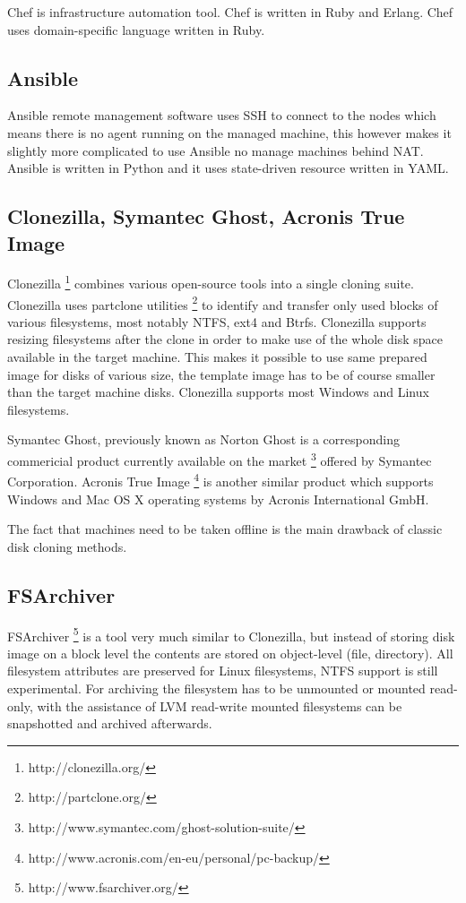 \documentclass{article}
\begin{document}
Chef is infrastructure automation tool. Chef is written in Ruby and Erlang. Chef uses domain-specific language written in Ruby.

\subsection{Ansible}

Ansible remote management software uses SSH to connect to the nodes which
means there is no agent running on the managed machine, this however makes
it slightly more complicated to use Ansible no manage machines behind NAT.
Ansible is written in Python and it uses state-driven resource 
written in YAML.

\subsection{Clonezilla, Symantec Ghost, Acronis True Image}

Clonezilla \footnote{http://clonezilla.org/}
combines various open-source tools into a single cloning suite.
Clonezilla uses partclone utilities \footnote{http://partclone.org/} to
identify and transfer only used blocks of various filesystems, most notably
NTFS, ext4 and Btrfs.
Clonezilla supports resizing filesystems after the clone
in order to make use of the whole disk space available
in the target machine.
This makes it possible to use same prepared image for disks of
various size, the template image has to be of course smaller
than the target machine disks.
Clonezilla supports most Windows and Linux filesystems.

Symantec Ghost, previously known as Norton Ghost is a corresponding commericial
product currently available on the market
\footnote{http://www.symantec.com/ghost-solution-suite/}
offered by Symantec Corporation.
Acronis True Image
\footnote{http://www.acronis.com/en-eu/personal/pc-backup/}
is another similar product which supports Windows
and Mac OS X operating systems by Acronis International GmbH.

The fact that machines need to be taken offline is the main
drawback of classic disk cloning methods. 

\subsection{FSArchiver}

FSArchiver
\footnote{http://www.fsarchiver.org/}
is a tool very much similar to Clonezilla,
but instead of storing disk image on a block level the
contents are stored on object-level (file, directory).
All filesystem attributes are preserved for Linux filesystems,
NTFS support is still experimental.
For archiving the filesystem has to be unmounted or mounted
read-only, with the assistance of LVM read-write mounted
filesystems can be snapshotted and archived afterwards.
\end{document}

